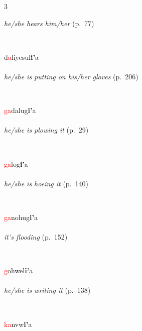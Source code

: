\documentclass[oneside,openany]{book}%
\begin{document}
\begin{multicols}{3}
\begin{minipage}[t]{\linewidth}
\noindent \textit{he/she hears him/her} (p.~77)
\end{minipage}\\[1em]%
\begin{minipage}[t]{\linewidth}
\raggedright\noindent d\textcolor{Red}{a}liyesul\textbf{i'}a\\
\\
\noindent \textit{he/she is putting on his/her gloves} (p.~206)
\end{minipage}\\[1em]%
\begin{minipage}[t]{\linewidth}
\raggedright\noindent \textcolor{Red}{ga}dalug\textbf{i'}a\\
\\
\noindent \textit{he/she is plowing it} (p.~29)
\end{minipage}\\[1em]%
\begin{minipage}[t]{\linewidth}
\raggedright\noindent \textcolor{Red}{ga}log\textbf{i'}a\\
\\
\noindent \textit{he/she is hoeing it} (p.~140)
\end{minipage}\\[1em]%
\begin{minipage}[t]{\linewidth}
\raggedright\noindent \textcolor{Red}{ga}nohug\textbf{i'}a\\
\\
\noindent \textit{it's flooding} (p.~152)
\end{minipage}\\[1em]%
\begin{minipage}[t]{\linewidth}
\raggedright\noindent \textcolor{Red}{g}ohwel\textbf{i'}a\\
\\
\noindent \textit{he/she is writing it} (p.~138)
\end{minipage}\\[1em]%
\begin{minipage}[t]{\linewidth}
\raggedright\noindent \textcolor{Red}{ka}nvw\textbf{i'}a\\
\\

\end{minipage}
\end{multicols}
\end{document}

